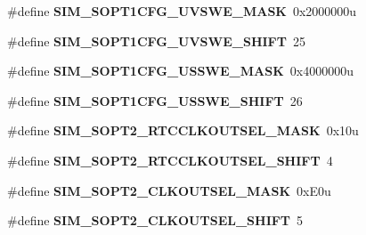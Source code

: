 \begin{DoxyCompactItemize}
\item 
\#define {\bfseries S\+I\+M\+\_\+\+S\+O\+P\+T1\+C\+F\+G\+\_\+\+U\+V\+S\+W\+E\+\_\+\+M\+A\+SK}~0x2000000u\hypertarget{group__SIM__Register__Masks_ga29e593e134a31bed2dbd3673c51cb330}{}\label{group__SIM__Register__Masks_ga29e593e134a31bed2dbd3673c51cb330}

\item 
\#define {\bfseries S\+I\+M\+\_\+\+S\+O\+P\+T1\+C\+F\+G\+\_\+\+U\+V\+S\+W\+E\+\_\+\+S\+H\+I\+FT}~25\hypertarget{group__SIM__Register__Masks_ga74d94a9794e03091f54b76a5c18c58b8}{}\label{group__SIM__Register__Masks_ga74d94a9794e03091f54b76a5c18c58b8}

\item 
\#define {\bfseries S\+I\+M\+\_\+\+S\+O\+P\+T1\+C\+F\+G\+\_\+\+U\+S\+S\+W\+E\+\_\+\+M\+A\+SK}~0x4000000u\hypertarget{group__SIM__Register__Masks_ga0b7d9fe471d5d689ba3feb001cf69b60}{}\label{group__SIM__Register__Masks_ga0b7d9fe471d5d689ba3feb001cf69b60}

\item 
\#define {\bfseries S\+I\+M\+\_\+\+S\+O\+P\+T1\+C\+F\+G\+\_\+\+U\+S\+S\+W\+E\+\_\+\+S\+H\+I\+FT}~26\hypertarget{group__SIM__Register__Masks_ga6984c7260abd4b7caccff970332eb4be}{}\label{group__SIM__Register__Masks_ga6984c7260abd4b7caccff970332eb4be}

\item 
\#define {\bfseries S\+I\+M\+\_\+\+S\+O\+P\+T2\+\_\+\+R\+T\+C\+C\+L\+K\+O\+U\+T\+S\+E\+L\+\_\+\+M\+A\+SK}~0x10u\hypertarget{group__SIM__Register__Masks_ga4ecc21f62a92e94e5f507a6bb5e44062}{}\label{group__SIM__Register__Masks_ga4ecc21f62a92e94e5f507a6bb5e44062}

\item 
\#define {\bfseries S\+I\+M\+\_\+\+S\+O\+P\+T2\+\_\+\+R\+T\+C\+C\+L\+K\+O\+U\+T\+S\+E\+L\+\_\+\+S\+H\+I\+FT}~4\hypertarget{group__SIM__Register__Masks_gaa4b7f7e8f1999ec0d56a1224cf7eb35d}{}\label{group__SIM__Register__Masks_gaa4b7f7e8f1999ec0d56a1224cf7eb35d}

\item 
\#define {\bfseries S\+I\+M\+\_\+\+S\+O\+P\+T2\+\_\+\+C\+L\+K\+O\+U\+T\+S\+E\+L\+\_\+\+M\+A\+SK}~0x\+E0u\hypertarget{group__SIM__Register__Masks_ga601bb7007f58e3ad5433d3538f4dcef0}{}\label{group__SIM__Register__Masks_ga601bb7007f58e3ad5433d3538f4dcef0}

\item 
\#define {\bfseries S\+I\+M\+\_\+\+S\+O\+P\+T2\+\_\+\+C\+L\+K\+O\+U\+T\+S\+E\+L\+\_\+\+S\+H\+I\+FT}~5\hypertarget{group__SIM__Register__Masks_ga520c9a255ff79372237f5f332f749112}{}\label{group__SIM__Register__Masks_ga520c9a255ff79372237f5f332f749112}


\end{DoxyCompactItemize}
